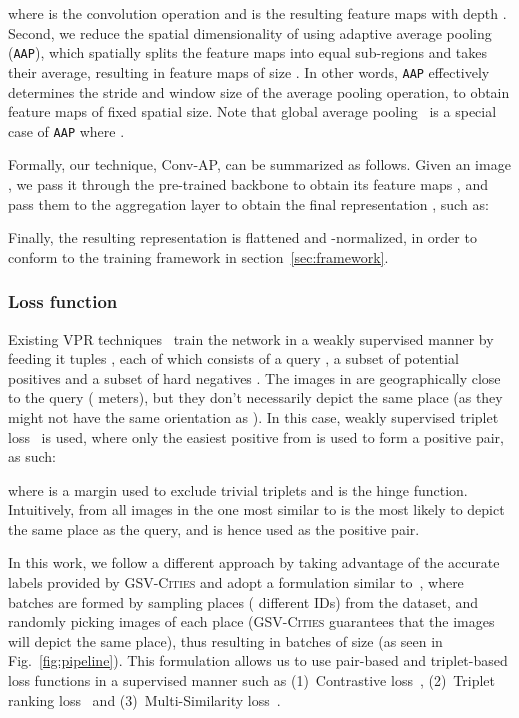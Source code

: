 \documentclass{article}
\begin{document}
where  is the convolution operation and  is the resulting feature maps with depth .
Second, we reduce the spatial dimensionality of  using adaptive average pooling (\verb!AAP!), which spatially splits the feature maps into  equal sub-regions and takes their average, resulting in feature maps of size . In other words, \verb!AAP! effectively determines the stride and window size of the average pooling operation, to obtain feature maps of fixed spatial size. Note that global average pooling~\cite{lin2013network} is a special case of \verb!AAP! where . 

Formally, our technique, Conv-AP, can be summarized as follows. Given an image , we pass it through the pre-trained backbone to obtain its feature maps , and pass them to the aggregation layer to obtain the final representation , such as:

Finally, the resulting representation  is flattened and -normalized, in order to conform to the training framework in section~\ref{sec:framework}.

\subsubsection{Loss function}\label{sec:loss}

Existing VPR techniques~\cite{arandjelovic2016netvlad, kim2017learned, liu2019stochastic, warburg2020mapillary} train the network in a weakly supervised manner by feeding it tuples , each of which consists of a query , a subset of potential positives  and a subset of hard negatives . The images in  are geographically close to the query  ( meters), but they don't necessarily depict the same place (as they might not have the same orientation as ). In this case, weakly supervised triplet loss~\cite{arandjelovic2016netvlad} is used, where only the easiest positive from  is used to form a positive pair, as such: 

where  is a margin used to exclude trivial triplets and  is the hinge function. Intuitively, from all images in  the one most similar to  is the most likely to depict the same place as the query, and is hence used as the positive pair.

In this work, we follow a different approach by taking advantage of the accurate labels provided by \textsc{GSV-Cities} and adopt a formulation similar to~\cite{hermans2017defense}, where batches are formed by sampling  places ( different IDs) from the dataset, and randomly picking  images of each place (\textsc{GSV-Cities} guarantees that the  images will depict the same place), thus resulting in batches of size  (as seen in Fig.~\ref{fig:pipeline}). This formulation allows us to use pair-based and triplet-based loss functions in a supervised manner such as (1)~Contrastive loss~\cite{hadsell2006dimensionality}, (2)~Triplet ranking loss~\cite{hoffer2015deep} and (3)~Multi-Similarity loss~\cite{wang2019multi}.
\end{document}
